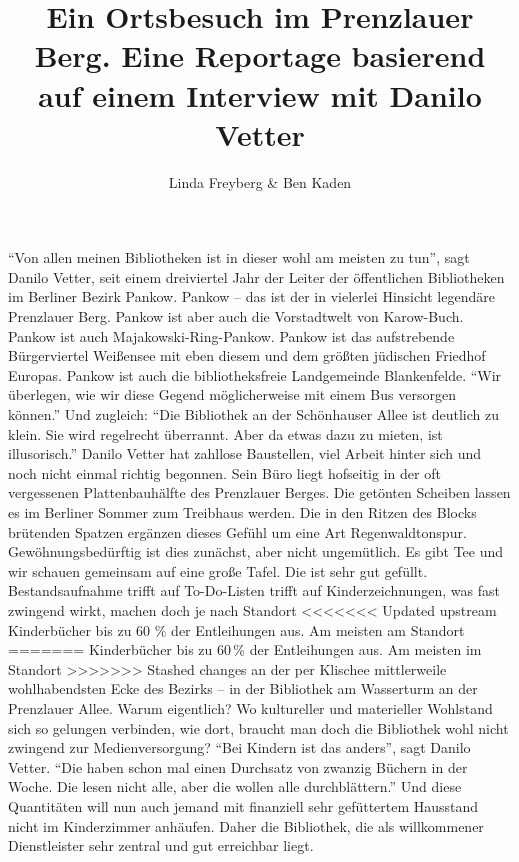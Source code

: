 \documentclass[a4paper,
fontsize=11pt,
oneside,
numbers=noperiodatend,
parskip=half-,
bibliography=totoc,
final
]{scrartcl}
\title{\LARGE{Ein Ortsbesuch im Prenzlauer Berg. Eine Reportage basierend auf einem Interview mit Danilo Vetter}} %
\author{Linda Freyberg \& Ben Kaden} %
\date{}
\begin{document}
\maketitle
\thispagestyle{fancyplain} 


\enquote{Von allen meinen Bibliotheken ist in dieser wohl am meisten zu
tun}, sagt Danilo Vetter, seit einem dreiviertel Jahr der Leiter der
öffentlichen Bibliotheken im Berliner Bezirk Pankow. Pankow -- das ist
der in vielerlei Hinsicht legendäre Prenzlauer Berg. Pankow ist aber
auch die Vorstadtwelt von Karow-Buch. Pankow ist auch
Majakowski-Ring-Pankow. Pankow ist das aufstrebende Bürgerviertel
Weißensee mit eben diesem und dem größten jüdischen Friedhof Europas.
Pankow ist auch die bibliotheksfreie Landgemeinde Blankenfelde.
\enquote{Wir überlegen, wie wir diese Gegend möglicherweise mit einem
Bus versorgen können.} Und zugleich: \enquote{Die Bibliothek an der
Schönhauser Allee ist deutlich zu klein. Sie wird regelrecht überrannt.
Aber da etwas dazu zu mieten, ist illusorisch.} Danilo Vetter hat
zahllose Baustellen, viel Arbeit hinter sich und noch nicht einmal
richtig begonnen. Sein Büro liegt hofseitig in der oft vergessenen
Plattenbauhälfte des Prenzlauer Berges. Die getönten Scheiben lassen es
im Berliner Sommer zum Treibhaus werden. Die in den Ritzen des Blocks
brütenden Spatzen ergänzen dieses Gefühl um eine Art Regenwaldtonspur.
Gewöhnungsbedürftig ist dies zunächst, aber nicht ungemütlich. Es gibt
Tee und wir schauen gemeinsam auf eine große Tafel. Die ist sehr gut
gefüllt. Bestandsaufnahme trifft auf To-Do-Listen trifft auf
Kinderzeichnungen, was fast zwingend wirkt, machen doch je nach Standort
<<<<<<< Updated upstream
Kinderbücher bis zu 60 \% der Entleihungen aus. Am meisten am Standort
=======
Kinderbücher bis zu 60\,\% der Entleihungen aus. Am meisten im Standort
>>>>>>> Stashed changes
an der per Klischee mittlerweile wohlhabendsten Ecke des Bezirks -- in
der Bibliothek am Wasserturm an der Prenzlauer Allee. Warum eigentlich?
Wo kultureller und materieller Wohlstand sich so gelungen verbinden, wie
dort, braucht man doch die Bibliothek wohl nicht zwingend zur
Medienversorgung? \enquote{Bei Kindern ist das anders}, sagt Danilo
Vetter. \enquote{Die haben schon mal einen Durchsatz von zwanzig Büchern
in der Woche. Die lesen nicht alle, aber die wollen alle durchblättern.}
Und diese Quantitäten will nun auch jemand mit finanziell sehr
gefüttertem Hausstand nicht im Kinderzimmer anhäufen. Daher die
Bibliothek, die als willkommener Dienstleister sehr zentral und gut
erreichbar liegt.
\end{document}

